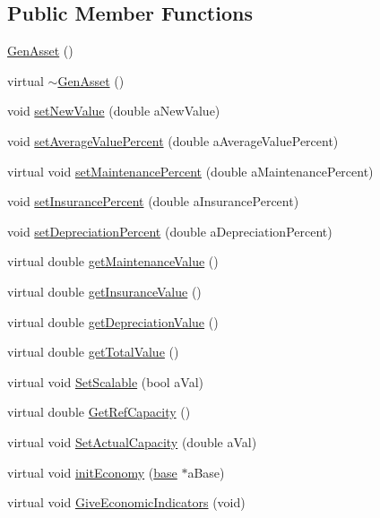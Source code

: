 \subsection*{Public Member Functions}
\begin{DoxyCompactItemize}
\item 
\hyperlink{class_gen_asset_ae5e36b860c07c895aeb3c4ccb5a0ed21}{GenAsset} ()
\item 
virtual \hyperlink{class_gen_asset_aab7ff58fdbc2be8f8fa8dffce8eb7e60}{$\sim$GenAsset} ()
\item 
void \hyperlink{class_gen_asset_ab98410163c3c96d2880af6dd1f851e13}{setNewValue} (double aNewValue)
\item 
void \hyperlink{class_gen_asset_a895d5e2aacd3c4c142b98a50596c31ce}{setAverageValuePercent} (double aAverageValuePercent)
\item 
virtual void \hyperlink{class_gen_asset_a9c031c6de5995cf919e8279625b5906d}{setMaintenancePercent} (double aMaintenancePercent)
\item 
void \hyperlink{class_gen_asset_af5618191f786b58058b554645238c7f0}{setInsurancePercent} (double aInsurancePercent)
\item 
void \hyperlink{class_gen_asset_afa9db65e8103f3379d2d947573965e80}{setDepreciationPercent} (double aDepreciationPercent)
\item 
virtual double \hyperlink{class_gen_asset_a702f6a8396de589c119a24aede39a930}{getMaintenanceValue} ()
\item 
virtual double \hyperlink{class_gen_asset_a2674387e6472f710910681e235a09c0c}{getInsuranceValue} ()
\item 
virtual double \hyperlink{class_gen_asset_abb1f15e982bee528c0be96e78764ec6b}{getDepreciationValue} ()
\item 
virtual double \hyperlink{class_gen_asset_a1e42b862553dca959bb6528a0413b321}{getTotalValue} ()
\item 
virtual void \hyperlink{class_gen_asset_ae0db954e462a227f73c3abdfa3dd91a6}{SetScalable} (bool aVal)
\item 
virtual double \hyperlink{class_gen_asset_ae5ee931a4a3e161320e83f8338ae79e9}{GetRefCapacity} ()
\item 
virtual void \hyperlink{class_gen_asset_a035e6cf6dbf11b247c330be31283bea8}{SetActualCapacity} (double aVal)
\item 
virtual void \hyperlink{class_gen_asset_a061638306e81bee77e8dfef34fe84a93}{initEconomy} (\hyperlink{classbase}{base} $\ast$aBase)
\item 
virtual void \hyperlink{class_gen_asset_a278eca323c1cf1bace458cda1103ac15}{GiveEconomicIndicators} (void)
\end{DoxyCompactItemize}
